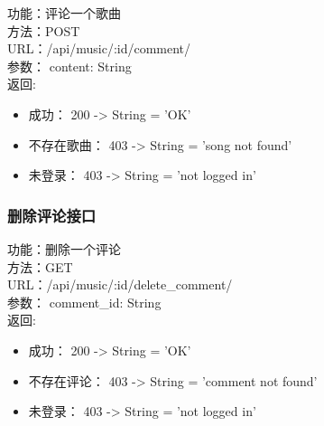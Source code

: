 \noindent
功能：评论一个歌曲\\
方法：POST\\
URL：/api/music/:id/comment/\\
参数： content: String\\
返回:
\begin{itemize}
	\item 成功： 200 -> String = 'OK'
	\item 不存在歌曲： 403 -> String = 'song not found'
	\item 未登录： 403 -> String = 'not logged in'
\end{itemize}

\subsubsection{删除评论接口}

\noindent
功能：删除一个评论\\
方法：GET\\
URL：/api/music/:id/delete\_comment/\\
参数： comment\_id: String\\
返回:
\begin{itemize}
	\item 成功： 200 -> String = 'OK'
	\item 不存在评论： 403 -> String = 'comment not found'
	\item 未登录： 403 -> String = 'not logged in'
\end{itemize}



